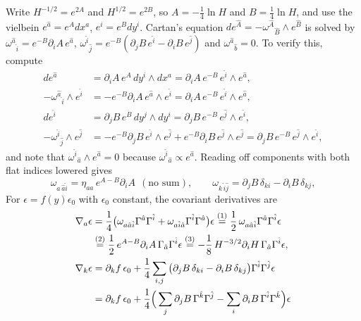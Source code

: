 \begin{tcolorbox}[breakable]
\begin{remark}
Write $H^{-1/2} = e^{2A}$ and $H^{1/2} = e^{2B}$, so $A = -\frac14\ln H$ and $B = \frac14\ln H$, and use the vielbein $e^{\hat a} = e^Adx^a$, $e^{\hat i} = e^Bdy^i$. Cartan's equation $de^{\hat A} = -\omega^{\hat A}{}_{\hat B}\wedge e^{\hat B}$ is solved by $\omega^{\hat a}{}_{\hat i} = e^{-B}\partial_iA\,e^{\hat a}$, $\omega^{\hat i}{}_{\hat j} = e^{-B}(\partial_jB\,e^{\hat i}-\partial_iB\,e^{\hat j})$ and $\omega^{\hat a}{}_{\hat b} = 0$. To verify this, compute
\begin{align*}
de^{\hat a} &= \partial_iA\,e^A\,dy^i\wedge dx^a = \partial_iA\,e^{-B}\,e^{\hat i}\wedge e^{\hat a}, \\
-\omega^{\hat a}{}_{\hat i}\wedge e^{\hat i} &= -e^{-B}\partial_iA\,e^{\hat a}\wedge e^{\hat i} = \partial_iA\,e^{-B}\,e^{\hat i}\wedge e^{\hat a}, \\
de^{\hat i} &= \partial_jB\,e^B\,dy^j\wedge dy^i = \partial_jB\,e^{-B}\,e^{\hat j}\wedge e^{\hat i}, \\
-\omega^{\hat i}{}_{\hat j}\wedge e^{\hat j} &= -e^{-B}\partial_jB\,e^{\hat i}\wedge e^{\hat j} + e^{-B}\partial_iB\,e^{\hat j}\wedge e^{\hat j} = \partial_jB\,e^{-B}\,e^{\hat j}\wedge e^{\hat i} ,
\end{align*}
and note that $\omega^{\hat i}{}_{\hat a}\wedge e^{\hat a} = 0$ because $\omega^{\hat i}{}_{\hat a}\propto e^{\hat a}$. Reading off components with both flat indices lowered gives
\begin{equation*}
\omega_{a\,\hat a\hat i} = \eta_{aa}\,e^{A-B}\partial_iA\ \ (\text{no sum}), \qquad
\omega_{k\,\hat i\hat j} = \partial_jB\,\delta_{ki} - \partial_iB\,\delta_{kj} ,
\end{equation*}
For $\epsilon = f(y)\epsilon_0$ with $\epsilon_0$ constant, the covariant derivatives are
\begin{align*}
\nabla_a\epsilon &= \frac14\big(\omega_{a\hat a\hat i}\Gamma^{\hat a}\Gamma^{\hat i} + \omega_{a\hat i\hat a}\Gamma^{\hat i}\Gamma^{\hat a}\big)\epsilon
\eqs{1} \frac12\,\omega_{a\hat a\hat i}\Gamma^{\hat a}\Gamma^{\hat i}\epsilon\\
&\eqs{2} \frac12\,e^{A-B}\partial_iA\,\Gamma_{\hat a}\Gamma^{\hat i}\epsilon
\eqs{3} -\frac18\,H^{-3/2}\partial_iH\,\Gamma_{\hat a}\Gamma^{\hat i}\epsilon , \\
\nabla_k\epsilon &= \partial_kf\,\epsilon_0 + \frac14\sum_{i,j}\big(\partial_jB\,\delta_{ki}-\partial_iB\,\delta_{kj}\big)\Gamma^{\hat i}\Gamma^{\hat j}\epsilon\\
&= \partial_kf\,\epsilon_0 + \frac14\Big(\sum_j\partial_jB\,\Gamma^{\hat k}\Gamma^{\hat j} - \sum_i\partial_iB\,\Gamma^{\hat i}\Gamma^{\hat k}\Big)\epsilon \\

\end{align*}
\end{remark}
\end{tcolorbox}
